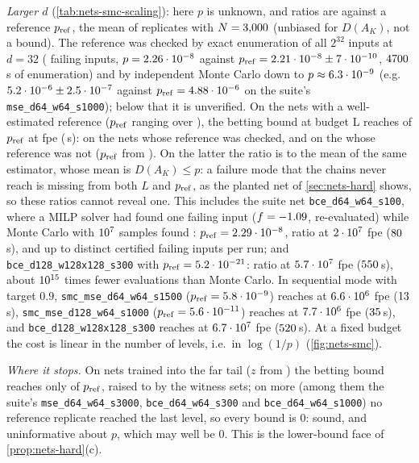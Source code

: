 \emph{Larger $d$} (\cref{tab:nets-smc-scaling}): here $p$ is unknown, and ratios are
against a reference $p_{\rm ref}$, the mean of \nnRefReps{} replicates with
$N=3{,}000$ (unbiased for $D(A_K)$, not a bound). The reference was checked by exact enumeration
of all $2^{32}$ inputs at $d=32$ (\nnDThirtyTwoF{} failing inputs, $p=2.26\cdot10^{-8}$
against $p_{\rm ref}=2.21\cdot10^{-8}\pm7\cdot10^{-10}$, $4700$\,s of
enumeration) and by independent Monte Carlo down to $p\approx6.3\cdot10^{-9}$ (e.g.\
$5.2\cdot10^{-6}\pm2.5\cdot10^{-7}$ against $p_{\rm ref}=4.88\cdot10^{-6}$ on the
suite's \texttt{mse\_d64\_w64\_s1000}); below that it is unverified. On the
\nnScaleNets{} nets with a well-estimated reference ($p_{\rm ref}$ ranging over
\nnScalePref{}), the betting bound at budget L reaches \nnScaleRatio{} of $p_{\rm ref}$ at
\nnScaleFpe{} fpe (\nnScaleSec{}\,s): \nnScaleRatioChecked{} on the \nnScaleChecked{} nets
whose reference was checked, and \nnScaleRatioUnchecked{} on the \nnScaleUnchecked{} whose
reference was not ($p_{\rm ref}$ from \nnScalePrefUnchecked{}). On the latter the ratio is
to the mean of the same estimator, whose mean is $D(A_K)\le p$: a failure mode that the
chains never reach is missing from both $L$ and $p_{\rm ref}$, as the planted net of
\cref{sec:nets-hard} shows, so these ratios cannot reveal one. This includes the suite net
\texttt{bce\_d64\_w64\_s100}, where a MILP solver had found one failing input
($f=-1.09$, re-evaluated) while Monte Carlo with $10^{7}$ samples found
\nnLargeMcHits{}: $p_{\rm
ref}=2.29\cdot10^{-8}$, ratio \nnWitNetRatio{} at $2\cdot10^{7}$ fpe ($80$\,s),
and up to \nnWitNetWits{} distinct certified failing inputs per run; and
\texttt{bce\_d128\_w128x128\_s300} with $p_{\rm ref}=5.2\cdot10^{-21}$: ratio \nnBigRatio{} at
$5.7\cdot10^{7}$ fpe ($550$\,s), about $10^{15}$ times fewer evaluations than Monte
Carlo. In sequential mode with target $0.9$, \texttt{smc\_mse\_d64\_w64\_s1500}
($p_{\rm ref}=5.8\cdot10^{-9}$) reaches \nnSeqARatio{} at $6.6\cdot10^{6}$ fpe ($13$\,s),
\texttt{smc\_mse\_d128\_w64\_s1000} ($p_{\rm ref}=5.6\cdot10^{-11}$) reaches \nnSeqBRatio{} at
$7.7\cdot10^{6}$ fpe ($35$\,s), and \texttt{bce\_d128\_w128x128\_s300} reaches
\nnSeqCRatio{} at $6.7\cdot10^{7}$ fpe ($520$\,s). At a fixed budget the cost is
linear in the number of levels, i.e.\ in $\log(1/p)$ (\cref{fig:nets-smc}).

\emph{Where it stops.} On \nnScaleTail{} nets trained into the far tail ($z$ from
\nnTailZ{}) the betting bound reaches only \nnTailBet{} of $p_{\rm ref}$, raised to
\nnTailWit{} by the witness sets; on \nnScaleZeroRef{} more (among them the suite's
\texttt{mse\_d64\_w64\_s3000}, \texttt{bce\_d64\_w64\_s300} and \texttt{bce\_d64\_w64\_s1000})
no reference replicate reached the last level, so every bound is $0$: sound, and
uninformative about $p$, which may well be $0$. This is the lower-bound face of
\cref{prop:nets-hard}(c).

